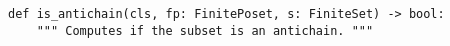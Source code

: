 \begin{verbatim}
def is_antichain(cls, fp: FinitePoset, s: FiniteSet) -> bool:
    """ Computes if the subset is an antichain. """
\end{verbatim}